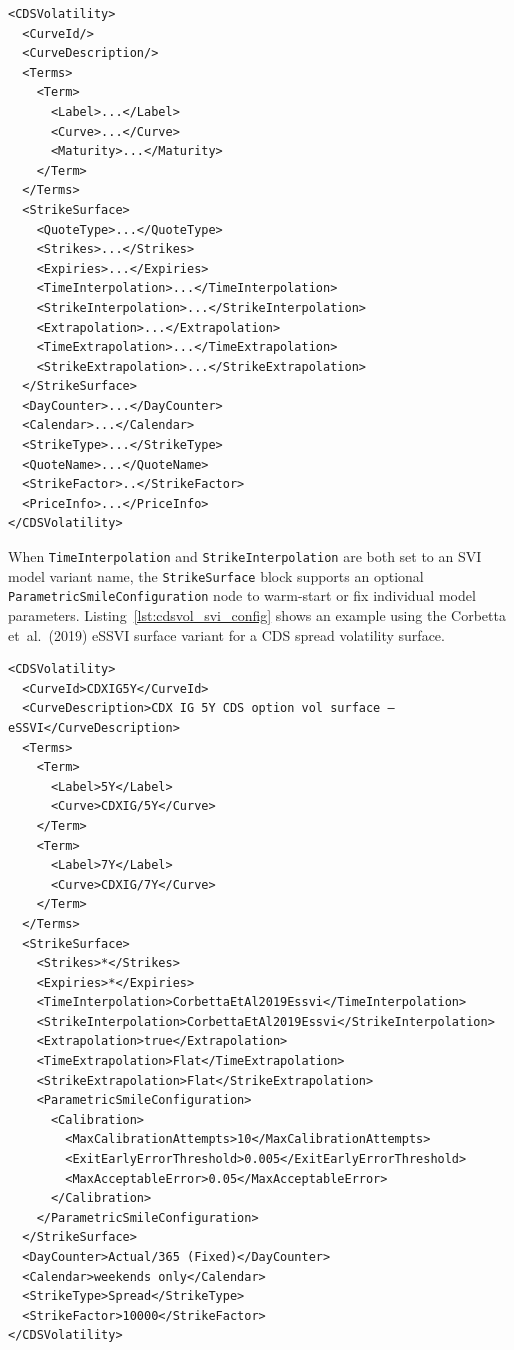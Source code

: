 \begin{longlisting}
\begin{verbatim}
<CDSVolatility>
  <CurveId/>
  <CurveDescription/>
  <Terms>
    <Term>
      <Label>...</Label>
      <Curve>...</Curve>
      <Maturity>...</Maturity>
    </Term>
  </Terms>
  <StrikeSurface>
    <QuoteType>...</QuoteType>
    <Strikes>...</Strikes>
    <Expiries>...</Expiries>
    <TimeInterpolation>...</TimeInterpolation>
    <StrikeInterpolation>...</StrikeInterpolation>
    <Extrapolation>...</Extrapolation>
    <TimeExtrapolation>...</TimeExtrapolation>
    <StrikeExtrapolation>...</StrikeExtrapolation>
  </StrikeSurface>
  <DayCounter>...</DayCounter>
  <Calendar>...</Calendar>
  <StrikeType>...</StrikeType>
  <QuoteName>...</QuoteName>
  <StrikeFactor>..</StrikeFactor>
  <PriceInfo>...</PriceInfo>
</CDSVolatility>
\end{verbatim}
\caption{CDS volatility surface configuration}
\label{lst:cdsvol_surface_config}
\end{longlisting}

When \lstinline!TimeInterpolation! and \lstinline!StrikeInterpolation! are both set to an SVI model variant name, the \lstinline!StrikeSurface! block supports an optional \lstinline!ParametricSmileConfiguration! node to warm-start or fix individual model parameters. Listing~\ref{lst:cdsvol_svi_config} shows an example using the Corbetta et~al.\ (2019) eSSVI surface variant for a CDS spread volatility surface.

\begin{longlisting}
\begin{verbatim}
<CDSVolatility>
  <CurveId>CDXIG5Y</CurveId>
  <CurveDescription>CDX IG 5Y CDS option vol surface — eSSVI</CurveDescription>
  <Terms>
    <Term>
      <Label>5Y</Label>
      <Curve>CDXIG/5Y</Curve>
    </Term>
    <Term>
      <Label>7Y</Label>
      <Curve>CDXIG/7Y</Curve>
    </Term>
  </Terms>
  <StrikeSurface>
    <Strikes>*</Strikes>
    <Expiries>*</Expiries>
    <TimeInterpolation>CorbettaEtAl2019Essvi</TimeInterpolation>
    <StrikeInterpolation>CorbettaEtAl2019Essvi</StrikeInterpolation>
    <Extrapolation>true</Extrapolation>
    <TimeExtrapolation>Flat</TimeExtrapolation>
    <StrikeExtrapolation>Flat</StrikeExtrapolation>
    <ParametricSmileConfiguration>
      <Calibration>
        <MaxCalibrationAttempts>10</MaxCalibrationAttempts>
        <ExitEarlyErrorThreshold>0.005</ExitEarlyErrorThreshold>
        <MaxAcceptableError>0.05</MaxAcceptableError>
      </Calibration>
    </ParametricSmileConfiguration>
  </StrikeSurface>
  <DayCounter>Actual/365 (Fixed)</DayCounter>
  <Calendar>weekends only</Calendar>
  <StrikeType>Spread</StrikeType>
  <StrikeFactor>10000</StrikeFactor>
</CDSVolatility>
\end{verbatim}
\caption{CDS volatility SVI surface configuration (Corbetta eSSVI)}
\label{lst:cdsvol_svi_config}
\end{longlisting}

